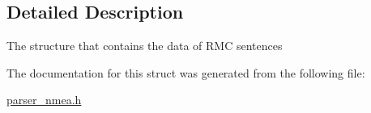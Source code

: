 \subsection{Detailed Description}
The structure that contains the data of R\+MC sentences 

The documentation for this struct was generated from the following file\+:\begin{DoxyCompactItemize}
\item 
\hyperlink{parser__nmea_8h}{parser\+\_\+nmea.\+h}\end{DoxyCompactItemize}
